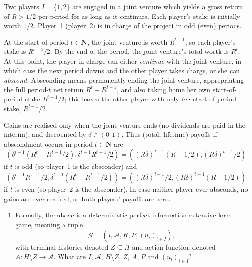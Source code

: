 \begin{exercise}
	\label{exercise:joint_venutre}
	Two players $I=\{1,2\}$ are engaged in a joint venture which yields a gross return of $R > 1/2$ per period for as long as it continues. Each player's stake is initially worth $1/2$. Player~1 (player~2) is in charge of the project in odd (even) periods.

	At the start of period $t \in \mathbf{N}$, the joint venture is worth $R^{t-1}$, so each player's stake is $R^{t-1}/2$. By the end of the period, the joint venture's total worth is $R^t$. At this point, the player in charge can either \emph{continue} with the joint venture, in which case the next period dawns and the other player takes charge, or she can \emph{abscond.} Absconding means permanently ending the joint venture, appropriating the full period-$t$ net return $R^t - R^{t-1}$, and also taking home her own start-of-period stake $R^{t-1}/2$; this leaves the other player with only \emph{her} start-of-period stake, $R^{t-1}/2$.

	Gains are realised only when the joint venture ends (no dividends are paid in the interim), and discounted by $\delta \in (0,1)$. Thus (total, lifetime) payoffs if abscondment occurs in period $t \in \mathbf{N}$ are
	\begin{equation*}
		\left( \delta^{t-1} \left( R^t - R^{t-1}/2 \right), \delta^{t-1} R^{t-1}/2 \right)
		= \left( (R\delta)^{t-1} (R-1/2), (R\delta)^{t-1}/2 \right)
	\end{equation*}
	if $t$ is odd (so player~1 is the absconder) and
	\begin{equation*}
		\left( \delta^{t-1} R^{t-1}/2, \delta^{t-1} \left( R^t - R^{t-1}/2 \right) \right)
		= \left( (R\delta)^{t-1}/2, (R\delta)^{t-1} (R-1/2) \right)
	\end{equation*}
	if $t$ is even (so player~2 is the absconder). In case neither player ever absconds, no gains are ever realised, so both players' payoffs are zero.

	\begin{enumerate}[label=(\alph*)]

		\item Formally, the above is a deterministic perfect-information extensive-form game, meaning a tuple
		\begin{equation*}
			\mathcal{G} = (I,\mathcal{A},H,P,(u_i)_{i \in I}) ,
		\end{equation*}
		with terminal histories denoted $Z \subseteq H$ and action function denoted $A : H \setminus Z \to \mathcal{A}$.
		What are $I$, $\mathcal{A}$, $H \setminus Z$, $Z$, $A$, $P$ and $(u_i)_{i \in I}$?


\end{enumerate}
\end{exercise}
